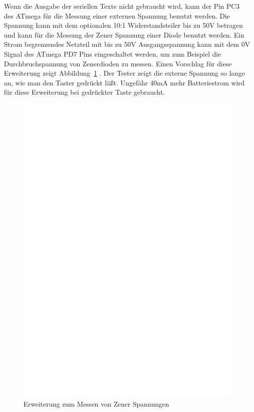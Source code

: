 Wenn die Ausgabe der seriellen Texte nicht gebraucht wird, kann der Pin PC3 des ATmega für die Messung
einer externen Spannung benutzt werden. Die Spannung kann mit dem optionalen 10:1 Widerstandsteiler
bis zu 50V betragen und kann für die Messung der Zener Spannung einer Diode benutzt werden.
Ein Strom begrenzendes Netzteil mit bis zu 50V Ausgangsspannung kann mit dem 0V Signal des ATmega PD7 Pins
eingeschaltet werden, um zum Beispiel die Durchbruchspannung von Zenerdioden zu messen.
Einen Vorschlag für diese Erweiterung zeigt Abbildung~\ref{fig:zener} .
Der Tester zeigt die externe Spannung so lange an, wie man den Taster gedrückt läßt.
Ungefähr 40mA mehr Batteriestrom wird für diese Erweiterung bei gedrückter Taste gebraucht.

\begin{figure}[H]
\centering
\includegraphics[width=18cm]{../FIG/zener_exp.eps}
\caption{Erweiterung zum Messen von Zener Spannungen}
\label{fig:zener}
\end{figure}

